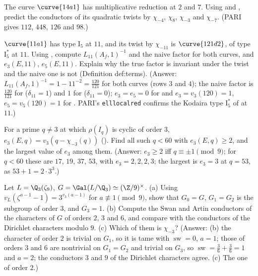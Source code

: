 \begin{exercise}\label{ex:local:ex-twist-conductor}
The curve $\curve{14a1}$ has multiplicative reduction at $2$ and $7$. Using  and , predict the
conductors of its quadratic twists by $\chi_{-4}$, $\chi_8$, $\chi_{-3}$ and $\chi_{-7}$. (PARI gives $112$, $448$, $126$ and $98$.)
\end{exercise}

\begin{exercise}\label{ex:local:ex-121d2}
$\curve{11a1}$ has type $\mathrm{I}_5$ at $11$, and its twist by $\chi_{-11}$ is $\curve{121d2}$, of type $\mathrm{I}_5^*$ at $11$. Using
, compute $L_{11}(A_f,1)^{-1}$ and the naive factor for both curves, and $e_3(E,11)$, $e_5(E,11)$. Explain why the true factor is
invariant under the twist and the naive one is not (Definition def:terms). (Answer: $L_{11}(A_f,1)^{-1}=1-11^{-2}=\frac{120}{121}$ for both curves (rows
$3$ and $4$); the naive factor is $\frac{120}{121}$ for  ($\delta_{11}=1$) and $1$ for  ($\delta_{11}=0$); $e_3=e_5=0$ for 
and $e_3=v_3(120)=1$, $e_5=v_5(120)=1$ for . PARI's \texttt{elllocalred} confirms the Kodaira type $\mathrm{I}_5^*$ of  at $11$.)
\end{exercise}

\begin{exercise}\label{ex:local:ex-e3}
For a prime $q\ne3$ at which $\rho(I_q)$ is cyclic of order $3$, $e_3(E,q)=v_3(q-\chi_{-3}(q))$ (). Find all such $q<60$ with
$e_3(E,q)\ge2$, and the largest value of $e_3$ among them. (Answer: $e_3\ge2$ iff $q\equiv\pm1\pmod9$; for $q<60$ these are $17$, $19$, $37$, $53$, with
$e_3=2,2,2,3$; the largest is $e_3=3$ at $q=53$, as $53+1=2\cdot3^3$.)
\end{exercise}

\begin{exercise}\label{ex:local:ex-zeta9}
Let $L=\Q_3(\zeta_9)$, $G=\Gal(L/\Q_3)\simeq(\Z/9)^\times$. (a) Using $v_L(\zeta^{a-1}-1)=3^{v_3(a-1)}$ for $a\not\equiv1\pmod9$, show that $G_0=G$, $G_1=G_2$ is the subgroup of
order $3$, and $G_3=1$. (b) Compute the Swan and Artin conductors of the characters of $G$ of orders $2$, $3$ and $6$, and compare with the conductors of the
Dirichlet characters modulo $9$. (c) Which of them is $\chi_{-3}$? (Answer: (b) the character of order $2$ is trivial on $G_1$, so it is tame with
$\operatorname{sw}=0$, $a=1$; those of orders $3$ and $6$ are nontrivial on $G_1=G_2$ and trivial on $G_3$, so $\operatorname{sw}=\frac36+\frac36=1$ and $a=2$; the
conductors $3$ and $9$ of the Dirichlet characters agree. (c) The one of order $2$.)
\end{exercise}


